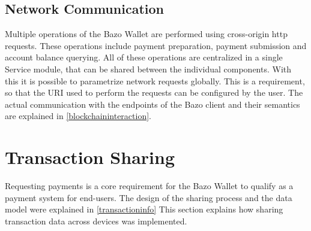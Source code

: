 \subsection{Network Communication}
Multiple operations of the Bazo Wallet are performed using cross-origin http requests. These operations include payment preparation, payment submission and account balance querying. All of these operations are centralized in a single Service module, that can be shared between the individual components. With this it is possible to parametrize network requests globally. This is a requirement, so that the URI used to perform the requests can be configured by the user. The actual communication with the endpoints of the Bazo client and their semantics are explained in \ref{blockchaininteraction}.

\section{Transaction Sharing}
Requesting payments is a core requirement for the Bazo Wallet to qualify as a payment system for end-users. The design of the sharing process and the data model were explained in \ref{transactioninfo} This section explains how sharing transaction data across devices was implemented.
